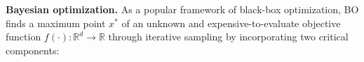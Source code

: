 \textbf{Bayesian optimization.} 
As a popular framework of black-box optimization, BO finds a maximum point ${x^*}$ of an unknown and expensive-to-evaluate objective function $f(\cdot): \mathbb{R}^d \rightarrow \mathbb{R}$ through iterative sampling by incorporating two critical components:
\vspace{-1mm}
